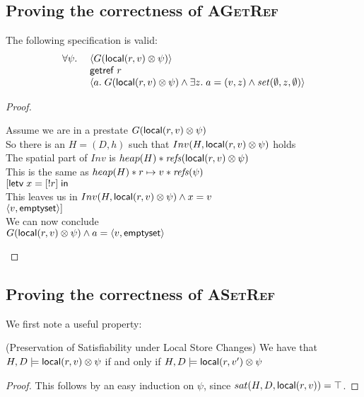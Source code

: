 \subsection{Proving the correctness of \textsc{AGetRef}}


\begin{prop*}
The following specification is valid: 
\begin{displaymath}
\begin{array}{ll}
    \forall \psi.\; 
    &  \left<G(\mathsf{local}({r}, {v}) \otimes \psi)\right> \\
    &  \mathsf{getref}\; r \\
    &  \left<a.\; G(\mathsf{local}({r}, {v}) \otimes \psi) 
                  \land  \exists z.\;a = (v,z) \land \mathit{set}(\emptyset, z, \emptyset)
       \right> \\
     \end{array}
\end{displaymath}
\end{prop*}
\begin{proof}
\begin{tabbedproof}
\oo Assume we are in a prestate $G(\mathsf{local}({r}, {v}) \otimes \psi)$ \\
\oo So there is an $H = (D,h)$ such that $Inv(H, \mathsf{local}({r}, {v}) \otimes \psi)$ holds \\
\oo The spatial part of $Inv$ is $heap(H) * \mathit{refs}(\mathsf{local}({r}, {v}) \otimes \psi)$ \\
\oo This is the same as $heap(H) * {r}\mapsto{v} * \mathit{refs}(\psi)$ \\
\oo $[\mathsf{letv}\;x = [!r]\;\mathsf{in}\;$ \\
\oo This leaves us in $Inv(H, \mathsf{local}({r}, {v}) \otimes \psi) \land x = v$ \\
\oo $\left<{v},{\mathsf{emptyset}}\right>]$ \\
\oo We can now conclude \\
\oo $G(\mathsf{local}({r}, {v}) \otimes \psi) \land a = \left<{v},{\mathsf{emptyset}}\right>$ \\
\end{tabbedproof}
\end{proof}

\subsection{Proving the correctness of \textsc{ASetRef}}

We first note a useful property:

\begin{lemma}{(Preservation of Satisfiability under Local Store Changes)}
We have that $H, D \models \mathsf{local}({r}, {v}) \otimes \psi$ if and only if $H, D \models \mathsf{local}({r}, {v'}) \otimes \psi$ 
\end{lemma}
\begin{proof}
This follows by an easy induction on $\psi$, since $sat(H, D, \mathsf{local}({r}, {v})) = \top$. 
\end{proof}

